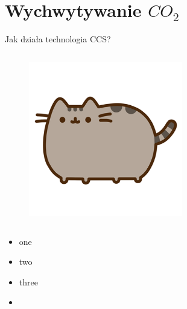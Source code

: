 \section{Wychwytywanie $CO_2$}

\begin{columnframe}{Jak działa technologia CCS?}
    \begin{column}{0.5\textwidth}
        \begin{figure}
            \centering
            \includegraphics[width=0.6\textwidth, frame]{images/pusheen.png}
        \end{figure}
    \end{column}
    \begin{column}{0.5\textwidth}
        \begin{itemize}
            \item one \keV
            \item two \MeV
            \item three \GeV
            \item \aegis
        \end{itemize}
    \end{column}
\end{columnframe}

